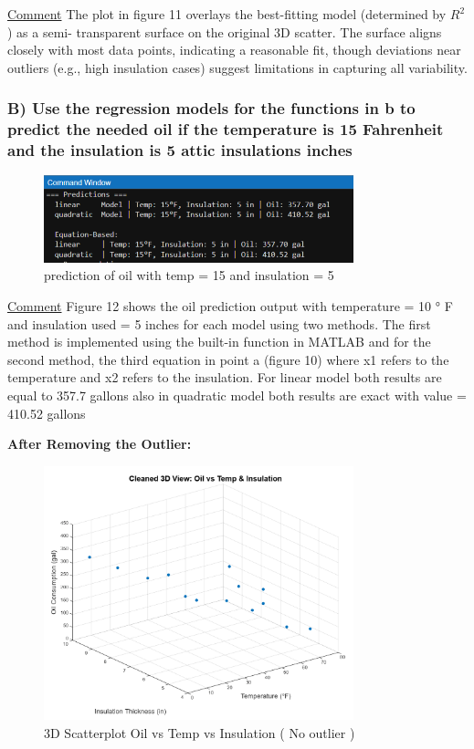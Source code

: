 \documentclass[12pt]{article}
\begin{document}
\uline{Comment}
The plot in figure 11 overlays the best-fitting model (determined by \(R^2\)) as a semi-
transparent surface on the original 3D scatter. The surface aligns closely with most data
points, indicating a reasonable fit, though deviations near outliers (e.g., high insulation
cases) suggest limitations in capturing all variability.

\subsubsection*{B) Use the regression models for the functions in b to predict the needed oil if the
temperature is 15 Fahrenheit and the insulation is 5 attic insulations inches}

\begin{figure}[H]
    \centering
    \includegraphics[width=0.8\textwidth]{12.png}
    \caption{prediction of oil with temp = 15 and insulation = 5}
\end{figure}

\uline{Comment}
Figure 12 shows the oil prediction output with temperature = 10 ° F and
insulation used = 5 inches for each model using two methods. The first method is
implemented using the built-in function in MATLAB and for the second method, the third
equation in point a (figure 10) where x1 refers to the temperature and x2 refers to the
insulation. For linear model both results are equal to 357.7 gallons also in quadratic
model both results are exact with value = 410.52 gallons

\textbf{After Removing the Outlier:}
\begin{figure}[h!]
    \centering
    \includegraphics[width=0.8\textwidth]{13.png}
    \caption{3D Scatterplot Oil vs Temp vs Insulation ( No outlier )}
\end{figure}
\end{document}
